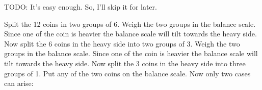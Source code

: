 \documentclass[titlepage,12pt]{book}
\begin{document}
\mainmatter

\begin{solution}
\end{solution}


\begin{solution}
    TODO: It's easy enough. So, I'll skip it for later.
\end{solution}

\begin{solution}
\end{solution}

\begin{solution}
    Split the 12 coins in two groups of 6.
    Weigh the two groups in the balance scale.
    Since one of the coin is heavier the 
    balance scale will tilt towards the heavy side.
    Now split the 6 coins in the heavy side into two groups of 3.
    Weigh the two groups in the balance scale.
    Since one of the coin is heavier the 
    balance scale will tilt towards the heavy side.
    Now split the 3 coins in the heavy side into three groups of 1.
    Put any of the two coins on the balance scale. Now only two cases can arise:
\end{solution}
\end{document}
